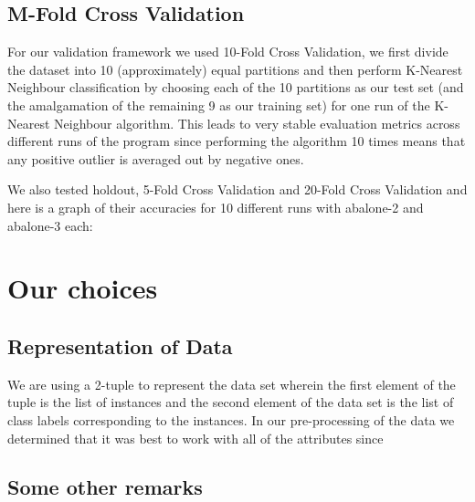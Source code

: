 \subsection{M-Fold Cross Validation}

For our validation framework we used 10-Fold Cross Validation, we first divide the dataset into 10 (approximately) equal partitions and then perform K-Nearest Neighbour classification by choosing each of the 10 partitions as our test set (and the amalgamation of the remaining 9 as our training set) for one run of the K-Nearest Neighbour algorithm. This leads to very stable evaluation metrics across different runs of the program since performing the algorithm 10 times means that any positive outlier is averaged out by negative ones.

We also tested holdout, 5-Fold Cross Validation and 20-Fold Cross Validation and here is a graph of their accuracies for 10 different runs with abalone-2 and abalone-3 each:





\section{Our choices}

\subsection{Representation of Data}

We are using a 2-tuple to represent the data set wherein the first element of the tuple is the list of instances and the second element of the data set is the list of class labels corresponding to the instances. 
In our pre-processing of the data we determined that it was best to work with all of the attributes since

\subsection{Some other remarks}



